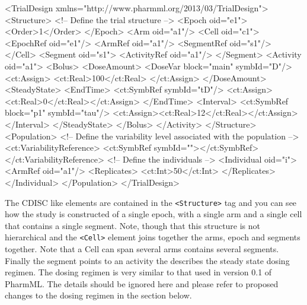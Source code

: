 \documentclass[a4paper,11pt]{article}
\newcommand{\pharmml}{PharmML\xspace}
\newcommand{\xelem}[1]{\texttt{<#1>}\index{XML Element!\texttt{<#1>}}}
\begin{document}
\begin{xmlcode}
    <TrialDesign xmlns="http://www.pharmml.org/2013/03/TrialDesign">
        <Structure>
            <!-- Define the trial structure -->
            <Epoch oid="e1">
                <Order>1</Order>
            </Epoch>
            <Arm oid="a1"/>
            <Cell oid="c1">
                <EpochRef oid="e1"/>
                <ArmRef oid="a1"/>
                <SegmentRef oid="s1"/>
            </Cell>
            <Segment oid="s1">
                <ActivityRef oid="a1"/>
            </Segment>
            <Activity oid="a1">
                <Bolus>
                    <DoseAmount>
                        <DoseVar block="main" symbId="D"/>
                        <ct:Assign>
                            <ct:Real>100</ct:Real>
                        </ct:Assign>
                    </DoseAmount>
                    <SteadyState>
                        <EndTime>
                            <ct:SymbRef symbId="tD"/>
                            <ct:Assign><ct:Real>0</ct:Real></ct:Assign>
                        </EndTime>
                        <Interval>
                            <ct:SymbRef block="p1" symbId="tau"/>
                            <ct:Assign><ct:Real>12</ct:Real></ct:Assign>
                        </Interval>
                    </SteadyState>
                </Bolus>
            </Activity>
        </Structure>
        <Population>
            <!-- Define the variability level associated with the
            population -->
            <ct:VariabilityReference>
                <ct:SymbRef symbId=""></ct:SymbRef>
            </ct:VariabilityReference>
            <!-- Define the individuals -->
            <Individual oid="i">
                <ArmRef oid="a1"/>
                <Replicates>
                    <ct:Int>50</ct:Int>
                </Replicates>
            </Individual>
        </Population>
    </TrialDesign>
\end{xmlcode}

The CDISC like elements are contained in the \xelem{Structure}
tag and you can see how the study is constructed of a single epoch,
with a single arm and a single cell that contains a single
segment. Note, though that this structure is not hierarchical and the
\xelem{Cell} element joins together the arms, epoch and segments
together. Note that a Cell can span several arms contains several
segments. Finally the segment points to an activity the describes
the steady state dosing regimen. The dosing regimen is very similar
to that used in version 0.1 of \pharmml. The details should be ignored
here and please refer to proposed changes to the dosing regimen in the
section below.
\end{document}
